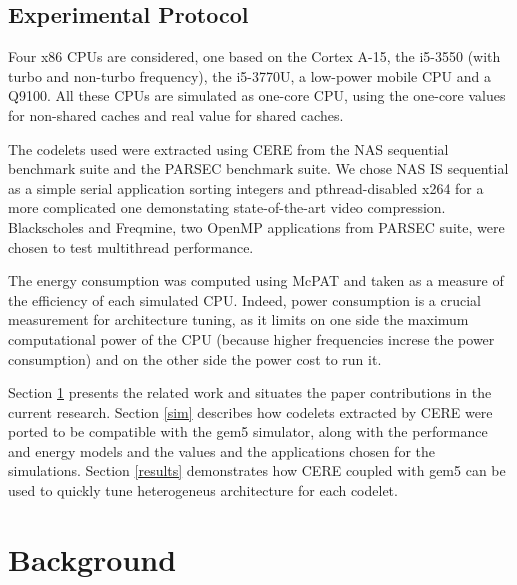 \documentclass{article}
\begin{document}
\begin{multicols}{2}
\subsection{Experimental Protocol}
Four x86 CPUs are considered, one based on the Cortex A-15\cite{DBLP:conf/samos/EndoCC14}, the i5-3550 (with turbo and non-turbo frequency), the i5-3770U, a low-power mobile CPU and a Q9100. All these CPUs are simulated as one-core CPU, using the one-core values for non-shared caches and real value for shared caches.

The codelets used were extracted using CERE\cite{CERE} from the NAS\cite{NAS} sequential benchmark suite and the PARSEC\cite{PARSEC} benchmark suite. We chose NAS IS sequential as a simple serial application sorting integers and pthread-disabled x264 for a more complicated one demonstating state-of-the-art video compression. Blackscholes and Freqmine, two OpenMP applications from PARSEC suite, were chosen to test multithread performance.


The energy consumption was computed using McPAT\cite{McPAT} and taken as a measure of the efficiency of each simulated CPU. Indeed, power consumption is a crucial measurement for architecture tuning, as it limits on one side the maximum computational power of the CPU (because higher frequencies increse the power consumption) and on the other side the power cost to run it.

Section \ref{bckgrnd} presents the related work and situates the paper contributions in the current research. Section \ref{sim} describes how codelets extracted by CERE were ported to be compatible with the gem5 simulator, along with the performance and energy models and the values and the applications chosen for the simulations. Section \ref{results} demonstrates how CERE coupled with gem5 can be used to quickly tune heterogeneus architecture for each codelet.


\section{Background}
\label{bckgrnd}






\end{multicols}
\end{document}
